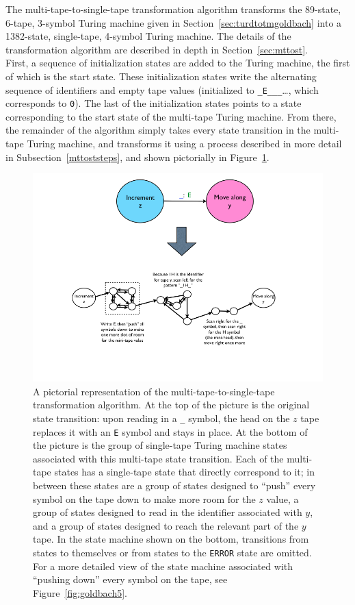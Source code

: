 \documentclass[11pt]{report}
\begin{document}
The multi-tape-to-single-tape transformation algorithm transforms the 89-state, 6-tape, 3-symbol Turing machine given in Section~\ref{sec:turdtotmgoldbach} into a 1382-state, single-tape, 4-symbol Turing machine. The details of the transformation algorithm are described in depth in Section~\ref{sec:mttost}. \\

First, a sequence of initialization states are added to the Turing machine, the first of which is the start state. These initialization states write the alternating sequence of identifiers and empty tape values (initialized to \texttt{\_E\_\_\_}\dots, which corresponds to \texttt{0}). The last of the initialization states points to a state corresponding to the start state of the multi-tape Turing machine. From there, the remainder of the algorithm simply takes every state transition in the multi-tape Turing machine, and transforms it using a process described in more detail in Subsection~\ref{mttoststeps}, and shown pictorially in Figure~\ref{fig:goldbach4}.

\begin{figure} 
\begin{center} 
\includegraphics[scale=0.4]{figs/goldbach4.png} 
\caption{A pictorial representation of the multi-tape-to-single-tape transformation algorithm. At the top of the picture is the original state transition: upon reading in a \texttt{\_} symbol, the head on the $z$ tape replaces it with an \texttt{E} symbol and stays in place. At the bottom of the picture is the group of single-tape Turing machine states associated with this multi-tape state transition. Each of the multi-tape states has a single-tape state that directly correspond to it; in between these states are a group of states designed to ``push'' every symbol on the tape down to make more room for the $z$ value, a group of states designed to read in the identifier associated with $y$, and a group of states designed to reach the relevant part of the $y$ tape. In the state machine shown on the bottom, transitions from states to themselves or from states to the \texttt{ERROR} state are omitted. For a more detailed view of the state machine associated with ``pushing down'' every symbol on the tape, see Figure~\ref{fig:goldbach5}. \label{fig:goldbach4}}
\end{center} 
\end{figure}
\end{document}
